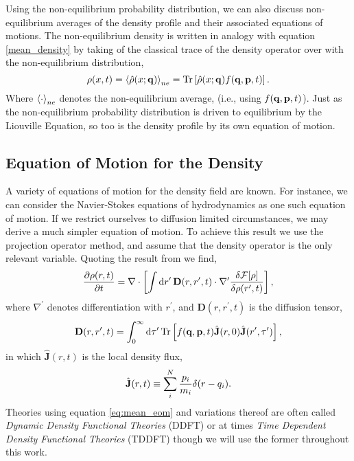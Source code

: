 Using the non-equilibrium probability distribution, we can also discuss
non-equilibrium averages of the density profile and their associated equations
of motions. The non-equilibrium density is written in analogy with equation
\ref{mean_density} by taking of the classical trace of the density operator
over with the non-equilibrium distribution,
%
\begin{equation}
    \rho(x, t) = \left\langle \hat{\rho}(x; \mathbf{q}) \right\rangle_{ne} =
        \mathrm{Tr}\left[ \hat{\rho}(x; \mathbf{q}) f(\mathbf{q}, \mathbf{p}, t) \right].
\end{equation}
%
Where $\left\langle \cdot \right\rangle_{ne}$ denotes the non-equilibrium average, (i.e., using $f(\mathbf{q}, \mathbf{p},t)$). Just as the
non-equilibrium probability distribution is driven to equilibrium by the
Liouville Equation, so too is the density profile by its own equation of
motion.

\subsection{Equation of Motion for the Density} %

A variety of equations of motion for the density field are known.  For
instance, we can consider the Navier-Stokes equations of hydrodynamics as one
such equation of motion. If we restrict ourselves to diffusion limited
circumstances, we may derive a much simpler equation of motion. To achieve
this result we use the projection operator method, and assume that the 
density operator is the only relevant variable. Quoting the result from
\cite{ESPANOL09} we find,
%
\begin{equation}
    \label{eq:mean_eom}
    \frac{\partial \rho(r, t)}{\partial t} = 
        \nabla \cdot \left[\int \mathrm{d}r^\prime\, \mathbf{D}(r, r^\prime, t) 
        \cdot \nabla^\prime \frac{\delta \mathcal{F}[\rho]}{\delta \rho(r^\prime, t)}\right],
\end{equation}
%
where $\nabla^\prime$ denotes differentiation with $r^\prime$, and $\mathbf{D}(r, r^\prime, t)$ is the diffusion tensor,
%
\begin{equation}
    \mathbf{D}(r, r^\prime, t) = \int_0^\infty \mathrm{d}\tau^\prime\,
        \mathrm{Tr}\left[ f(\mathbf{q}, \mathbf{p}, t)\hat{\mathbf{J}}(r, 0)
        \hat{\mathbf{J}}(r^\prime, \tau^\prime) \right],
\end{equation}
%
in which $\hat{\mathbf{J}}(r, t)$ is the local density flux,
%
\begin{equation}
    \hat{\mathbf{J}}(r, t) \equiv 
        \sum_i^N \frac{p_i}{m_i} \delta(r - q_i).
\end{equation}
%
Theories using equation \ref{eq:mean_eom} and variations thereof are often
called \textit{Dynamic Density Functional Theories} (DDFT) or at times
\textit{Time Dependent Density Functional Theories} (TDDFT) though we will use
the former throughout this work.

